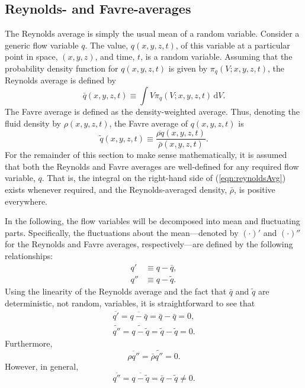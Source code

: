 \documentclass[letterpaper,11pt,nointlimits,reqno,draft]{amsart}
\begin{document}
\subsection{Reynolds- and Favre-averages}
\label{sec:averaging}

The Reynolds average is simply the usual mean of a random variable.  Consider a
generic flow variable $q$.  The value, $q(x, y, z, t)$, of this variable at a
particular point in space, $(x, y, z)$, and time, $t$, is a random variable.
Assuming that the probability density function for $q(x, y, z, t)$ is given by
$\pi_q(V; x, y, z, t)$, the Reynolds average is defined by
%
\begin{equation}
\label{eqn:reynoldsAvg}
\bar{q}(x, y, z, t) \equiv \int V \pi_q(V; x, y, z, t) \,\mathrm{d} V.
\end{equation}
%
The Favre average is defined as the density-weighted average.  Thus,
denoting the fluid density by $\rho(x,y,z, t)$, the Favre average of
$q(x,y,z, t)$ is
%
\begin{equation*}
\tilde{q}(x,y,z, t) \equiv \frac{ \overline{\rho q}(x,y,z, t) }{ \bar{\rho}(x,y,z, t) }.
\end{equation*}
%
For the remainder of this section to make sense mathematically, it is
assumed that both the Reynolds and Favre averages are well-defined for
any required flow variable, $q$.  That is, the integral on the
right-hand side of (\ref{eqn:reynoldsAvg}) exists whenever required,
and the Reynolds-averaged density, $\bar{\rho}$, is positive
everywhere.

In the following, the flow variables will be decomposed into mean and
fluctuating parts.  Specifically, the fluctuations about the
mean---denoted by $(\cdot)'$ and $(\cdot)''$ for the Reynolds and
Favre averages, respectively---are defined by the following
relationships:
%
\begin{align*}
q' &\equiv q - \bar{q}, \\
q'' &\equiv q - \tilde{q}.
\end{align*}
%
Using the linearity of the Reynolds average and the fact that
$\bar{q}$ and $\tilde{q}$ are deterministic, not random, variables, it
is straightforward to see that
%
\begin{gather*}
\overline{q'} = \overline{q - \bar{q}} = \bar{q} - \bar{q} =  0, \\
\widetilde{q''} = \widetilde{q - \tilde{q}} = \tilde{q} - \tilde{q} = 0.
\end{gather*}
%
Furthermore,
%
\begin{equation*}
\overline{\rho q''} = \bar{\rho} \widetilde{q''} = 0.
\end{equation*}
%
However, in general,
%
\begin{equation*}
\overline{q''} = \overline{q - \tilde{q}} = \bar{q} - \tilde{q} \neq 0.
\end{equation*}
%
\end{document}
